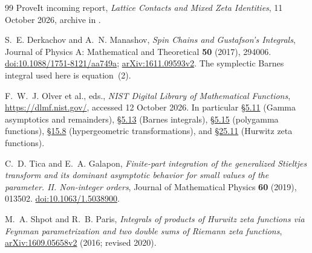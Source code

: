 \documentclass[11pt,a4paper]{article}
\numberwithin{equation}{section}
\theoremstyle{definition}
\theoremstyle{remark}
\begin{document}
\begin{thebibliography}{99}
ProveIt incoming report, \emph{Lattice Contacts and Mixed Zeta Identities},
11 October 2026, archive
in \cite{ProveIt}.

S.~E. Derkachov and A.~N. Manashov,
\emph{Spin Chains and Gustafson's Integrals},
Journal of Physics A: Mathematical and Theoretical \textbf{50} (2017),
294006. \href{https://doi.org/10.1088/1751-8121/aa749a}{doi:10.1088/1751-8121/aa749a};
\href{https://arxiv.org/abs/1611.09593v2}{arXiv:1611.09593v2}.
The symplectic Barnes integral used here is equation~(2).

F.~W.~J. Olver et al., eds.,
\emph{NIST Digital Library of Mathematical Functions},
\url{https://dlmf.nist.gov/}, accessed 12 October 2026.
In particular \href{https://dlmf.nist.gov/5.11}{\S5.11}
(Gamma asymptotics and remainders),
\href{https://dlmf.nist.gov/5.13}{\S5.13}
(Barnes integrals), \href{https://dlmf.nist.gov/5.15}{\S5.15}
(polygamma functions), \href{https://dlmf.nist.gov/15.8}{\S15.8}
(hypergeometric transformations), and
\href{https://dlmf.nist.gov/25.11}{\S25.11}
(Hurwitz zeta functions).

C.~D. Tica and E.~A. Galapon,
\emph{Finite-part integration of the generalized Stieltjes transform
and its dominant asymptotic behavior for small values of the parameter.
II. Non-integer orders}, Journal of Mathematical Physics
\textbf{60} (2019), 013502.
\href{https://doi.org/10.1063/1.5038900}{doi:10.1063/1.5038900}.

M.~A. Shpot and R.~B. Paris,
\emph{Integrals of products of Hurwitz zeta functions via Feynman
parametrization and two double sums of Riemann zeta functions},
\href{https://arxiv.org/abs/1609.05658v2}{arXiv:1609.05658v2}
(2016; revised 2020).

\end{thebibliography}

\end{document}
